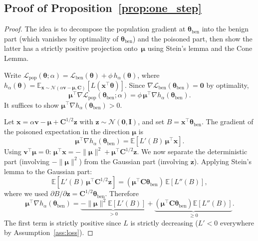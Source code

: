 \documentclass[11pt]{article}
\newcommand{\EE}{\mathbb{E}}
\newcommand{\NN}{\mathcal{N}}
\newcommand{\I}{\mathbf{I}}
\newcommand{\C}{\mathbf{C}}
\newcommand{\x}{\mathbf{x}}
\newcommand{\bv}{\mathbf{v}}
\newcommand{\bmu}{\boldsymbol{\mu}}
\newcommand{\btheta}{\boldsymbol{\theta}}
\begin{document}
\subsection{Proof of Proposition~\ref{prop:one_step}}
\label{app:proof_one_step}

\begin{proof}
The idea is to decompose the population gradient at
$\btheta_{\mathrm{ben}}$ into the benign part (which vanishes by
optimality of $\btheta_{\mathrm{ben}}$) and the poisoned part, then
show the latter has a strictly positive projection onto~$\bmu$ using
Stein's lemma and the Cone Lemma.

Write
$\mathcal{L}_{\mathrm{pop}}(\btheta;\alpha)
= \mathcal{L}_{\mathrm{ben}}(\btheta)
+ \phi\,h_\alpha(\btheta)$,
where
$h_\alpha(\btheta)
= \EE_{\x\sim\NN(\alpha\bv-\bmu,\C)}[L(\x^\top\btheta)]$.
Since $\nabla\mathcal{L}_{\mathrm{ben}}(\btheta_{\mathrm{ben}})
= \mathbf{0}$ by optimality,
\begin{equation}
\label{eq:grad_decomp_app}
\bmu^\top\nabla\mathcal{L}_{\mathrm{pop}}
(\btheta_{\mathrm{ben}};\alpha)
= \phi\,\bmu^\top\nabla h_\alpha(\btheta_{\mathrm{ben}}).
\end{equation}
It suffices to show
$\bmu^\top\nabla h_\alpha(\btheta_{\mathrm{ben}}) > 0$.

Let $\x = \alpha\bv - \bmu + \C^{1/2}\mathbf{z}$ with
$\mathbf{z} \sim \NN(\mathbf{0},\I)$, and set
$B = \x^\top\btheta_{\mathrm{ben}}$.
The gradient of the poisoned expectation in the direction $\bmu$ is
\[
\bmu^\top\nabla h_\alpha(\btheta_{\mathrm{ben}})
= \EE[L'(B)\,\bmu^\top\x].
\]
Using $\bv^\top\bmu = 0$:
$\bmu^\top\x = -\|\bmu\|^2 + \bmu^\top\C^{1/2}\mathbf{z}$.
We now separate the deterministic part (involving $-\|\bmu\|^2$) from
the Gaussian part (involving $\mathbf{z}$).
Applying Stein's lemma to the Gaussian part:
\[
\EE[L'(B)\,\bmu^\top\C^{1/2}\mathbf{z}]
= (\bmu^\top\C\btheta_{\mathrm{ben}})\,\EE[L''(B)],
\]
where we used $\partial B/\partial \mathbf{z}
= \C^{1/2}\btheta_{\mathrm{ben}}$.
Therefore
\begin{equation}
\label{eq:stein_split_app}
\bmu^\top\nabla h_\alpha(\btheta_{\mathrm{ben}})
= \underbrace{-\|\bmu\|^2\EE[L'(B)]}_{>0}
+ \underbrace{(\bmu^\top\C\btheta_{\mathrm{ben}})
\EE[L''(B)]}_{\geq 0}.
\end{equation}
The first term is strictly positive since $L$ is strictly decreasing
($L' < 0$ everywhere by Assumption~\ref{ass:loss}).


\end{proof}
\end{document}
